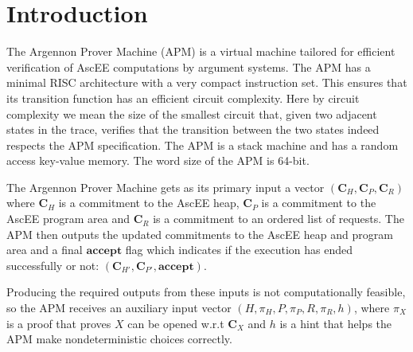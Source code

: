 
\section{Introduction}\label{sec:introduction3}

The Argennon Prover Machine (APM) is a virtual machine tailored for efficient verification of AscEE computations by
argument systems. The APM has a minimal RISC architecture with a very compact instruction set. This ensures that
its transition function has an efficient circuit complexity. Here by circuit complexity we mean the size
of the smallest circuit that, given two adjacent states in the trace, verifies that the transition between the two
states indeed respects the APM specification. The APM is a stack machine and has a random access key-value memory.
The word size of the APM is 64-bit.

The Argennon Prover Machine gets as its primary input a vector $(\mathbf{C}_H,\mathbf{C}_P,\mathbf{C}_R)$ where
$\mathbf{C}_H$ is a commitment to the AscEE heap, $\mathbf{C}_P$ is a commitment to the AscEE program area and
$\mathbf{C}_R$ is a commitment to an ordered list of requests. The APM then outputs the updated
commitments to the AscEE heap and program area and a final $\mathbf{accept}$ flag which indicates if the execution has
ended successfully or not: $(\mathbf{C}_{H'},\mathbf{C}_{P'},\mathbf{accept})$.

Producing the required outputs from these inputs is not computationally feasible, so the APM receives an auxiliary
input vector $(H,\pi_H,P,\pi_P,R,\pi_R,h)$, where $\pi_X$ is a proof that proves $X$ can be opened w.r.t
$\mathbf{C}_X$ and $h$ is a hint that helps the APM make nondeterministic choices correctly.

